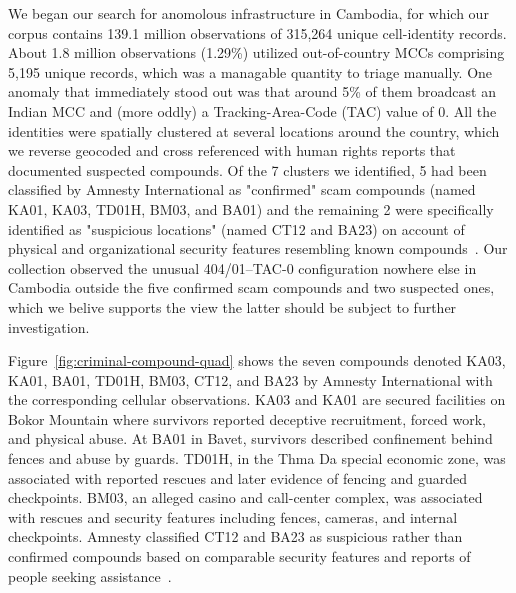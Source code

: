 We began our search for anomolous infrastructure in Cambodia, for which our
corpus contains 139.1 million observations of 315,264 unique cell-identity
records. About 1.8 million observations (1.29\%) utilized out-of-country MCCs
comprising 5,195 unique records, which was a managable quantity to triage
manually. One anomaly that immediately stood out was that around 5\% of them
broadcast an Indian MCC and (more oddly) a Tracking-Area-Code (TAC) value of 0.
All the identities were spatially clustered at several locations around the
country, which we reverse geocoded and cross referenced with human rights
reports that documented suspected compounds. Of the 7 clusters we identified, 5
had been classified by Amnesty International as "confirmed" scam compounds
(named KA01, KA03, TD01H, BM03, and BA01) and the remaining 2 were specifically
identified as "suspicious locations" (named CT12 and BA23) on account of
physical and organizational security features resembling known
compounds~\cite{amnesty-cambodia-scams-2025,amnesty-cambodia-scams-2026}. Our
collection observed the unusual 404/01–TAC-0 configuration nowhere else in
Cambodia outside the five confirmed scam compounds and two suspected ones, which
we belive supports the view the latter should be subject to further
investigation.

Figure~\ref{fig:criminal-compound-quad} shows the seven compounds denoted KA03,
KA01, BA01, TD01H, BM03, CT12, and BA23 by Amnesty International with the corresponding cellular
observations. KA03 and KA01 are secured facilities on Bokor Mountain where
survivors reported deceptive recruitment, forced work, and physical abuse. At
BA01 in Bavet, survivors described confinement behind fences and abuse by
guards. TD01H, in the Thma Da special economic zone, was associated with
reported rescues and later evidence of fencing and guarded checkpoints.
BM03, an alleged casino and
call-center complex, was associated with rescues and security features including
fences, cameras, and internal
checkpoints. Amnesty classified CT12 and BA23 as suspicious rather than
confirmed compounds based on comparable security features and reports of people
seeking assistance~\cite{amnesty-cambodia-scams-2025,amnesty-cambodia-scams-2026}.


